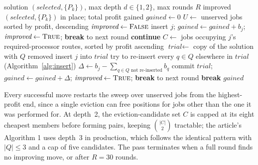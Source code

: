 \documentclass[11pt]{article}
\begin{document}
\begin{algorithm}[t]
\caption{Ejection-chain post-processing}
\label{alg:ejection}
\begin{algorithmic}[1]
\Require solution $(\textit{selected}, \{P_k\})$, max depth $d\in\{1,2\}$, max rounds $R$
\Ensure improved $(\textit{selected}, \{P_k\})$ in place; total profit gained
\State $\textit{gained} \gets 0$
    \State $U \gets$ unserved jobs sorted by profit, descending
    \State $\textit{improved} \gets \textsc{False}$
     
            \State insert $j$; $\textit{gained} \gets \textit{gained} + b_j$; $\textit{improved} \gets \textsc{True}$; \textbf{break} to next round
        \EndIf
    \EndFor
     \textbf{continue} \EndIf
     
        \State $C \gets$ jobs occupying $j$'s required-processor routes, sorted by profit ascending 
            \State $\textit{trial} \gets$ copy of the solution with $Q$ removed
                \State insert $j$ into $\textit{trial}$
                \State try to re-insert every $q\in Q$ elsewhere in $\textit{trial}$ (Algorithm~\ref{alg:insert})
                \State $\Delta \gets b_j - \sum_{q\in Q \text{ not re-inserted}} b_q$
                    \State commit $\textit{trial}$; $\textit{gained} \gets \textit{gained}+\Delta$; $\textit{improved}\gets\textsc{True}$; \textbf{break} to next round
                \EndIf
            \EndIf
        \EndFor
    \EndFor
     \textbf{break} \EndIf
\EndFor
\State \Return $\textit{gained}$
\end{algorithmic}
\end{algorithm}

Every successful move restarts the sweep over unserved jobs from the highest-profit end, since a single eviction can free positions for jobs other than the one it was performed for. At depth~2, the eviction-candidate set $C$ is capped at its eight cheapest members before forming pairs, keeping $\binom{|C|}{2}$ tractable; the article's Algorithm 1 uses depth~3 in production, which follows the identical pattern with $|Q|\le 3$ and a cap of five candidates. The pass terminates when a full round finds no improving move, or after $R=30$ rounds.
\end{document}
